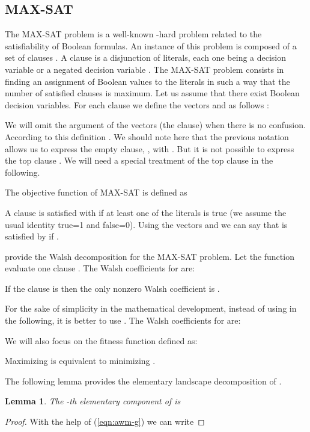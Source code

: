 \documentclass{article}
\newtheorem{lemma}{Lemma}
\begin{document}
\subsection{MAX-SAT}
\label{subsec:max-sat}



The MAX-SAT problem is a well-known -hard problem related to the satisfiability of Boolean formulas. An instance of this problem is composed of a set of clauses . A clause is a disjunction of literals, each one being a decision variable  or a negated decision variable . The MAX-SAT problem consists in finding an assignment of Boolean values to the literals in such a way that the number of satisfied clauses is maximum. Let us assume that there exist  Boolean decision variables.
For each clause  we define the vectors  and  as follows \citep{Sutton2009}:


We will omit the argument of the vectors (the clause) when there is no confusion. According to this definition . We should note here that the previous notation allows us to express the empty clause, , with . But it is not possible to express the top clause . We will need a special treatment of the top clause in the following.

The objective function of MAX-SAT is defined as


A clause  is satisfied with  if at least one of the literals is true (we assume the usual identity true=1 and false=0). Using the vectors  and  we can say that  is satisfied by  if .

\cite{Sutton2009} provide the Walsh decomposition for the MAX-SAT problem. Let the function  evaluate one clause . 
The Walsh coefficients for  are:

If the clause  is  then the only nonzero Walsh coefficient is .

For the sake of simplicity in the mathematical development, instead of using  in the following, it is better to use . The Walsh coefficients for  are:


We will also focus on the fitness function  defined as:

Maximizing  is equivalent to minimizing .



The following lemma provides the elementary landscape decomposition of . 
\begin{lemma}
\label{lem:g-eld}
The -th elementary component of  is

\end{lemma}
\begin{proof}
With the help of (\ref{eqn:awm-g}) we can write

\end{proof}
\end{document}

